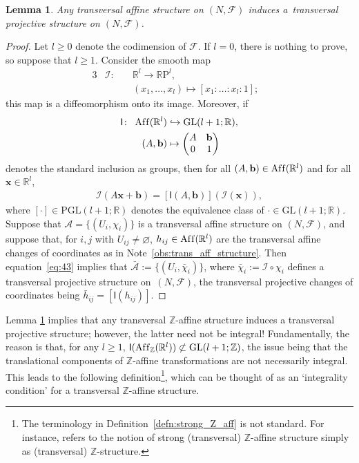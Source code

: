 \documentclass[pdftex]{sigma}
\numberwithin{equation}{section}
\newtheorem{Lemma}[Theorem]{Lemma}
\newcommand{\RR}{\mathbb{R}}
\newcommand{\ZZ}{\mathbb{Z}}
\begin{document}
\begin{Lemma}\label{lemma:affine_as_proj}
Any transversal affine structure on $(N,\mathcal{F})$ induces a~transversal projective structure on $(N,\mathcal{F})$.
\end{Lemma}
\begin{proof}
Let $l \geq 0$ denote the codimension of $\mathcal{F}$. If $l =0$, there is nothing to prove, so suppose that $l \geq 1$. Consider the smooth map
 \begin{alignat*}{3}
 & \mathcal{I} \colon \ && \RR^l \to \RR\mathrm{P}^l, & \\
 &&& \left(x_1,\ldots,x_l\right) \mapsto [x_1:\ldots:x_l :1];&
 \end{alignat*}
this map is a dif\/feomorphism onto its image. Moreover, if
 \begin{gather} \label{eq:41}
 \begin{split}
 \mathsf{I} \colon \ \operatorname{Af\/f}(\RR^l) &\hookrightarrow \mathrm{GL}(l+1;\RR), \\
 (A,\mathbf{b}) &\mapsto
 \begin{pmatrix}
 A & \mathbf{b} \\
 0 & 1
 \end{pmatrix}
 \end{split}
 \end{gather}
denotes the standard inclusion as groups, then for all $(A,\mathbf{b}) \in \operatorname{Af\/f}(\RR^l)$ and for
 all $\mathbf{x} \in \RR^l$,
 \begin{gather} \label{eq:43}
 \mathcal{I} (A \mathbf{x} + \mathbf{b} ) = [\mathsf{I}(A,\mathbf{b})](\mathcal{I}(\mathbf{x})),
 \end{gather}
where $[\cdot] \in \mathrm{PGL}(l+1;\RR)$ denotes the equivalence class of $\cdot \in \mathrm{GL}(l+1;\RR)$. Suppose that $\mathcal{A}=\{(U_i, \chi_i)\}$ is a transversal af\/f\/ine structure on $(N,\mathcal{F})$, and suppose that, for $i,j$ with $U_{ij} \neq \varnothing$, $h_{ij} \in \operatorname{Af\/f}(\RR^l)$ are the transversal af\/f\/ine changes of coordinates as in Note~\ref{obs:trans_aff_structure}. Then equation~\eqref{eq:43} implies that $\bar{\mathcal{A}}:=\{(U_i,\bar{\chi}_i)\}$, where $\bar{\chi}_i := \mathcal{I} \circ \chi_i$ def\/ines a transversal projective structure on~$(N,\mathcal{F})$, the transversal projective changes of coordinates being $\bar{h}_{ij}=[\mathsf{I}(h_{ij})]$.
\end{proof}

Lemma \ref{lemma:affine_as_proj} implies that any transversal $\ZZ$-af\/f\/ine structure induces a transversal projective structure; however, the latter need not be integral! Fundamentally, the reason is that, for any $l \geq 1$, $\mathsf{I}(\operatorname{Af\/f}_{\ZZ}(\RR^l))\not\subset \mathrm{GL}(l+1;\ZZ)$, the issue being that the translational components of $\ZZ$-af\/f\/ine transformations are not necessarily integral. This leads to the following def\/inition\footnote{The terminology in Def\/inition~\ref{defn:strong_Z_aff} is not standard. For instance, \cite{gross_siebert} refers to the notion of strong (transversal) $\ZZ$-af\/f\/ine structure simply as (transversal) $\ZZ$-structure.}, which can be thought of as an `integrality condition' for a transversal $\ZZ$-af\/f\/ine structure.
\end{document}
